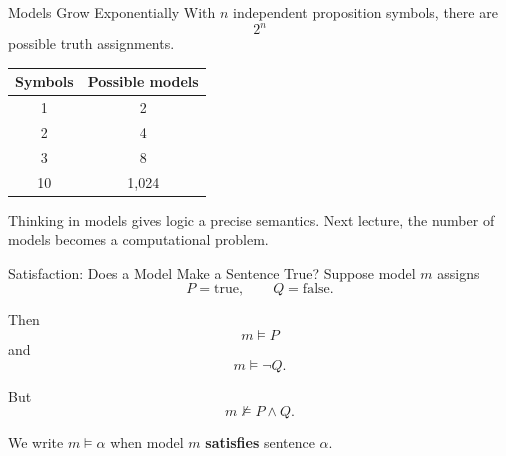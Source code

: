 \documentclass[aspectratio=169,10pt]{beamer}
\begin{document}
\begin{frame}[shrink=10]{Models Grow Exponentially}
  With \(n\) independent proposition symbols, there are
  \[
    2^n
  \]
  possible truth assignments.

  \begin{center}
    \renewcommand{\arraystretch}{1.25}
    \begin{tabular}{c|c}
      \textbf{Symbols} & \textbf{Possible models} \\\hline
      1 & 2 \\
      2 & 4 \\
      3 & 8 \\
      10 & 1,024 \\
    \end{tabular}
  \end{center}

  \begin{keyidea}
    Thinking in models gives logic a precise semantics. Next lecture, the number of models becomes a computational problem.
  \end{keyidea}
\end{frame}

\begin{frame}[shrink=10]{Satisfaction: Does a Model Make a Sentence True?}
  Suppose model \(m\) assigns
  \[
    P=\mathrm{true},\qquad Q=\mathrm{false}.
  \]

  Then
  \[
    m\models P
  \]
  and
  \[
    m\models \neg Q.
  \]

  But
  \[
    m\not\models P\land Q.
  \]

  \begin{cpdefinition}
    We write \(m\models\alpha\) when model \(m\) \textbf{satisfies} sentence \(\alpha\).
  \end{cpdefinition}
\end{frame}
\end{document}
